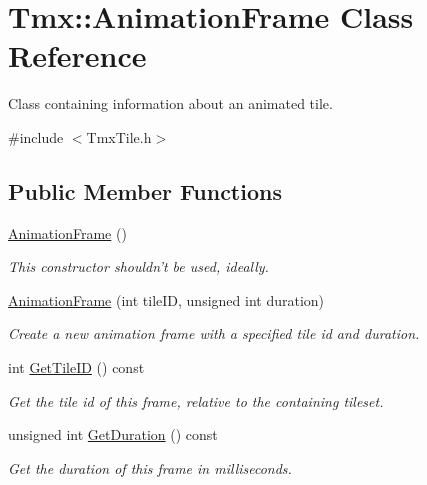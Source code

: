 \hypertarget{classTmx_1_1AnimationFrame}{\section{Tmx\-:\-:Animation\-Frame Class Reference}
\label{classTmx_1_1AnimationFrame}
}


Class containing information about an animated tile.  




{\ttfamily \#include $<$Tmx\-Tile.\-h$>$}

\subsection*{Public Member Functions}
\begin{DoxyCompactItemize}
\item 
\hypertarget{classTmx_1_1AnimationFrame_a5c82aebb547d7e1131d3189978900040}{\hyperlink{classTmx_1_1AnimationFrame_a5c82aebb547d7e1131d3189978900040}{Animation\-Frame} ()}\label{classTmx_1_1AnimationFrame_a5c82aebb547d7e1131d3189978900040}

\begin{DoxyCompactList}\small\item\em This constructor shouldn't be used, ideally. \end{DoxyCompactList}\item 
\hypertarget{classTmx_1_1AnimationFrame_a84a24bfb968c6e8c37e2031acbaf8df4}{\hyperlink{classTmx_1_1AnimationFrame_a84a24bfb968c6e8c37e2031acbaf8df4}{Animation\-Frame} (int tile\-I\-D, unsigned int duration)}\label{classTmx_1_1AnimationFrame_a84a24bfb968c6e8c37e2031acbaf8df4}

\begin{DoxyCompactList}\small\item\em Create a new animation frame with a specified tile id and duration. \end{DoxyCompactList}\item 
\hypertarget{classTmx_1_1AnimationFrame_ae55cf73d125a551f130dca4d04740193}{int \hyperlink{classTmx_1_1AnimationFrame_ae55cf73d125a551f130dca4d04740193}{Get\-Tile\-I\-D} () const }\label{classTmx_1_1AnimationFrame_ae55cf73d125a551f130dca4d04740193}

\begin{DoxyCompactList}\small\item\em Get the tile id of this frame, relative to the containing tileset. \end{DoxyCompactList}\item 
\hypertarget{classTmx_1_1AnimationFrame_a50c2a730e35796dd20af47398bdd9941}{unsigned int \hyperlink{classTmx_1_1AnimationFrame_a50c2a730e35796dd20af47398bdd9941}{Get\-Duration} () const }\label{classTmx_1_1AnimationFrame_a50c2a730e35796dd20af47398bdd9941}

\begin{DoxyCompactList}\small\item\em Get the duration of this frame in milliseconds. \end{DoxyCompactList}\end{DoxyCompactItemize}


